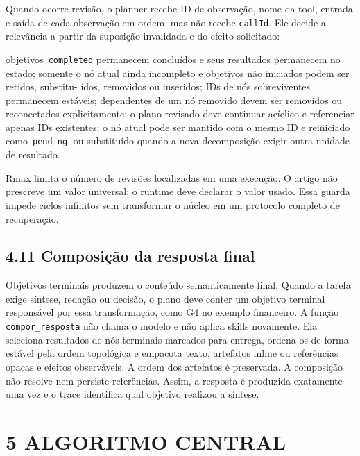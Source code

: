 \documentclass[12pt,a4paper]{article}
\begin{document}
Quando ocorre revisão, o planner recebe ID de observação, nome da tool, entrada e saída de cada observação em ordem, mas não recebe \texttt{callId}. Ele decide a relevância a partir da suposição invalidada e do efeito solicitado:


\noindent \textbullet{} objetivos\texttt{ completed} permanecem concluídos e seus resultados permanecem no estado; \textbullet{} somente o nó atual ainda incompleto e objetivos não iniciados podem ser retidos, substitu- ídos, removidos ou inseridos; \textbullet{} IDs de nós sobreviventes permanecem estáveis; \textbullet{} dependentes de um nó removido devem ser removidos ou reconectados explicitamente; \textbullet{} o plano revisado deve continuar acíclico e referenciar apenas IDs existentes; \textbullet{} o nó atual pode ser mantido com o mesmo ID e reiniciado como\texttt{ pending}, ou substituído quando a nova decomposição exigir outra unidade de resultado.\par

Rmax limita o número de revisões localizadas em uma execução. O artigo não prescreve um valor universal; o runtime deve declarar o valor usado. Essa guarda impede ciclos infinitos sem transformar o núcleo em um protocolo completo de recuperação.


\subsection*{4.11 Composição da resposta final}

Objetivos terminais produzem o conteúdo semanticamente final. Quando a tarefa exige síntese, redação ou decisão, o plano deve conter um objetivo terminal responsável por essa transformação, como G4 no exemplo financeiro. A função\texttt{ compor\_resposta} não chama o modelo e não aplica skills novamente. Ela seleciona resultados de nós terminais marcados para entrega, ordena-os de forma estável pela ordem topológica e empacota texto, artefatos inline ou referências opacas e efeitos observáveis. A ordem dos artefatos é preservada. A composição não resolve nem persiste referências. Assim, a resposta é produzida exatamente uma vez e o trace identifica qual objetivo realizou a síntese.





\section*{5 ALGORITMO CENTRAL}
\end{document}
